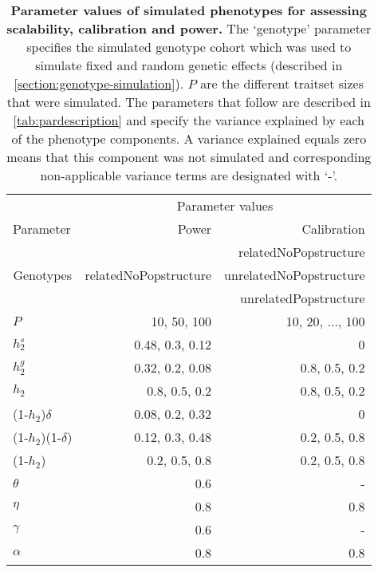 \begin{table}[htbp]
  \centering
  \caption[\textbf{Parameter values of simulated phenotypes for assessing scalability, calibration and power.}]{\textbf{Parameter values of simulated phenotypes for assessing scalability, calibration and power.} The `genotype' parameter specifies the simulated genotype cohort which was used to simulate fixed and random genetic effects (described in \cref{section:genotype-simulation}). \(P\) are the different traitset sizes that were simulated. The parameters that follow are described in \cref{tab:pardescription} and specify the variance explained by each of the phenotype components. A variance explained equals zero means that this component was not simulated and corresponding non-applicable variance terms are designated with `-'.} 
    \begin{tabular}{lrr}
    \toprule
          & \multicolumn{2}{c}{Parameter values} \\
\cmidrule{2-3}    Parameter & Power  & Calibration \\
    \midrule
    \multicolumn{1}{c}{\multirow{3}[1]{*}{Genotypes}} & \multicolumn{1}{c}{\multirow{3}[1]{*}{relatedNoPopstructure}} & relatedNoPopstructure \\
          &       & unrelatedNoPopstructure \\
          &       & unrelatedPopstructure \\
          \addlinespace[1.5ex]
    \(P\) & 10, 50, 100 & 10, 20, \(\ldots\), 100 \\
   \addlinespace[1.5ex]
    \(h_2^s\) & 0.48, 0.3, 0.12 & 0 \\
    \(h_2^g\) & 0.32, 0.2, 0.08 & 0.8, 0.5, 0.2 \\
    \(h_2\) & 0.8, 0.5, 0.2 & 0.8, 0.5, 0.2 \\
    (1-\(h_2\))\(\delta\) & 0.08, 0.2, 0.32 & 0 \\
    (1-\(h_2\))(1-\(\delta\)) & 0.12, 0.3, 0.48 & 0.2, 0.5, 0.8 \\
    (1-\(h_2\)) & 0.2, 0.5, 0.8 & 0.2, 0.5, 0.8 \\
    \(\theta\) & 0.6   &  - \\
    \(\eta\) & 0.8   & 0.8 \\
    \(\gamma\) & 0.6   &  - \\
    \(\alpha\) & 0.8   & 0.8 \\
    \bottomrule
    \end{tabular}%
\label{tab:parvalues}%
\end{table}%

